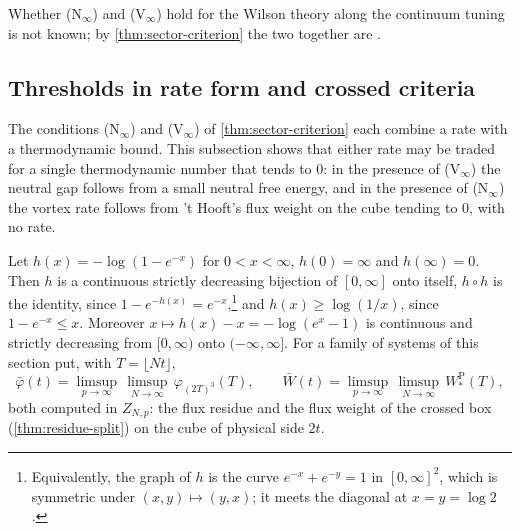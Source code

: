 \documentclass[11pt,a4paper]{amsart}
\theoremstyle{definition}
\theoremstyle{remark}
\numberwithin{equation}{section}
\newcommand{\cube}[1]{(2#1)^3}             %
\newcommand{\Mcirc}{\text{\upshape(M$^{\circ}$)}}   %
\begin{document}
Whether \textup{(N$_\infty$)} and \textup{(V$_\infty$)} hold for the Wilson theory along the continuum tuning is not known; by \cref{thm:sector-criterion} the two together are \Mcirc{}.

\subsection{Thresholds in rate form and crossed criteria}

The conditions \textup{(N$_\infty$)} and \textup{(V$_\infty$)} of \cref{thm:sector-criterion} each combine a rate with a thermodynamic bound. This subsection shows that either rate may be traded for a single thermodynamic number that tends to $0$: in the presence of \textup{(V$_\infty$)} the neutral gap follows from a small neutral free energy, and in the presence of \textup{(N$_\infty$)} the vortex rate follows from 't Hooft's flux weight on the cube tending to $0$, with no rate.

Let $h(x)=-\log(1-e^{-x})$ for $0<x<\infty$, $h(0)=\infty$ and $h(\infty)=0$. Then $h$ is a continuous strictly decreasing bijection of $[0,\infty]$ onto itself, $h\circ h$ is the identity, since $1-e^{-h(x)}=e^{-x}$,\footnote{Equivalently, the graph of $h$ is the curve $e^{-x}+e^{-y}=1$ in $[0,\infty]^2$, which is symmetric under $(x,y)\mapsto(y,x)$; it meets the diagonal at $x=y=\log2$.} and $h(x)\ge\log(1/x)$, since $1-e^{-x}\le x$. Moreover $x\mapsto h(x)-x=-\log(e^x-1)$ is continuous and strictly decreasing from $[0,\infty)$ onto $(-\infty,\infty]$. For a family of systems of this section put, with $T=\lfloor Nt\rfloor$,
\[
\bar\varphi(t)=\limsup_{p\to\infty}\,\limsup_{N\to\infty}\,\varphi_{\cube T}(T),\qquad \bar W(t)=\limsup_{p\to\infty}\,\limsup_{N\to\infty}\,W^{\mathrm P}_*(T),
\]
both computed in $Z_{N,p}$: the flux residue and the flux weight of the crossed box (\cref{thm:residue-split}) on the cube of physical side $2t$.
\end{document}
